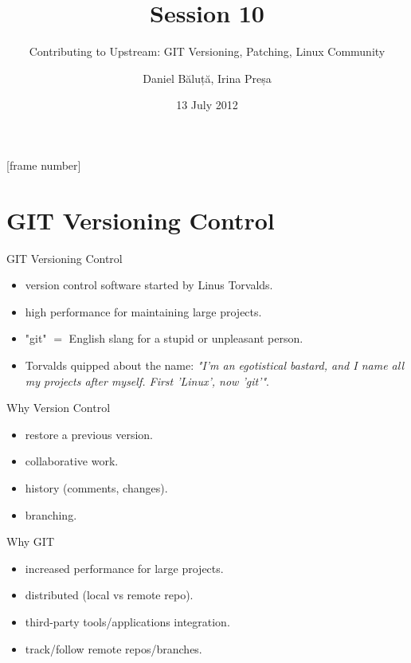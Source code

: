 \documentclass{workshop}
\title[Sesssion 10]{Session 10}
\subtitle{Contributing to Upstream: GIT Versioning, Patching, Linux Community}
\author{Daniel Băluță, Irina Preșa}
\date{13 July 2012}
\begin{document}
[frame number]

\frame{\titlepage}

\section{GIT Versioning Control}

\begin{frame}{GIT Versioning Control}
\begin{itemize}
\item version control software started by Linus Torvalds.
\item high performance for maintaining large projects.
\item<2> "git" $=$ English slang for a stupid or unpleasant person.
\item<2> Torvalds quipped about the name: \emph{"I'm an egotistical bastard, and I
name all my projects after myself. First 'Linux', now 'git'"}.
\end{itemize}
\end{frame}

\begin{frame}{Why Version Control}
\begin{itemize}
\item restore a previous version.
\item collaborative work.
\item history (comments, changes).
\item branching.
\end{itemize}
\end{frame}

\begin{frame}{Why GIT}
\begin{itemize}
\item increased performance for large projects.
\item distributed (local vs remote repo).
\item third-party tools/applications integration.
\item track/follow remote repos/branches.
\end{itemize}
\end{frame}
\end{document}
